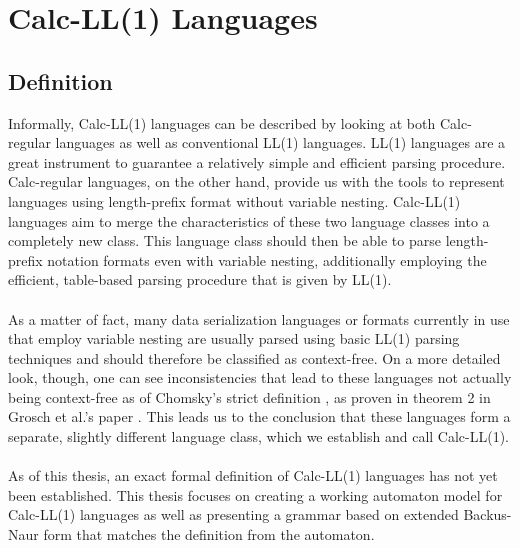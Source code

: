 \section{Calc-LL(1) Languages}
\label{3.0}
\subsection{Definition}
\label{3.1}
Informally, Calc-LL(1) languages can be described by looking at both Calc-regular languages as well as conventional LL(1) languages. LL(1) languages are a great instrument to guarantee a relatively simple and efficient parsing procedure. Calc-regular languages, on the other hand, provide us with the tools to represent languages using length-prefix format without variable nesting. Calc-LL(1) languages aim to merge the characteristics of these two language classes into a completely new class. This language class should then be able to parse length-prefix notation formats even with variable nesting, additionally employing the efficient, table-based parsing procedure that is given by LL(1).\\\\
As a matter of fact, many data serialization languages or formats currently in use that employ variable nesting are usually parsed using basic LL(1) parsing techniques and should therefore be classified as context-free. On a more detailed look, though, one can see inconsistencies that lead to these languages not actually being context-free as of Chomsky's strict definition \cite{Chomsky-Hierarchy}, as proven in theorem 2 in Grosch et al.'s paper \cite{Calc-regular-paper}.  This leads us to the conclusion that these languages form a separate, slightly different language class, which we establish and call Calc-LL(1).\\\\
As of this thesis, an exact formal definition of Calc-LL(1) languages has not yet been established. This thesis focuses on creating a working automaton model for Calc-LL(1) languages as well as presenting a grammar based on extended Backus-Naur form \cite{EBNF} that matches the definition from the automaton.
